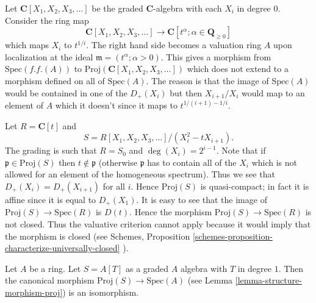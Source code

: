 \begin{example}
\label{example-not-existence-valuative-big-proj}
Let $\mathbf{C}[X_1, X_2, X_3, \ldots]$ be the graded $\mathbf{C}$-algebra
with each $X_i$ in degree $0$. Consider the ring map
$$
\mathbf{C}[X_1, X_2, X_3, \ldots]
\longrightarrow
\mathbf{C}[t^\alpha ; \alpha \in \mathbf{Q}_{\geq 0}]
$$
which maps $X_i$ to $t^{1/i}$. The right hand side becomes a valuation ring
$A$ upon localization at the ideal $\mathfrak m = (t^\alpha ; \alpha > 0)$.
This gives a morphism from $\text{Spec}(f.f.(A))$ to
$\text{Proj}(\mathbf{C}[X_1, X_2, X_3, \ldots])$ which does not
extend to a morphism defined on all of $\text{Spec}(A)$.
The reason is that the image of $\text{Spec}(A)$ would be contained
in one of the $D_{+}(X_i)$ but then $X_{i + 1}/X_i$ would map
to an element of $A$ which it doesn't since it maps to
$t^{1/(i + 1) - 1/i}$.
\end{example}

\begin{example}
\label{example-not-existence-valuative-small-proj}
Let $R = \mathbf{C}[t]$ and
$$
S = R[X_1, X_2, X_3, \ldots]/(X_i^2 - tX_{i + 1}).
$$
The grading is such that $R = S_0$ and $\deg(X_i) = 2^{i - 1}$.
Note that if $\mathfrak p \in \text{Proj}(S)$ then
$t \not \in \mathfrak p$ (otherwise $\mathfrak p$ has to contain
all of the $X_i$ which is not allowed for an element of
the homogeneous spectrum). Thus we see that
$D_{+}(X_i) = D_{+}(X_{i + 1})$ for all $i$. Hence
$\text{Proj}(S)$ is quasi-compact; in fact it is affine
since it is equal to $D_{+}(X_1)$. It is easy to see that
the image of $\text{Proj}(S) \to \text{Spec}(R)$ is
$D(t)$. Hence the morphism $\text{Proj}(S) \to \text{Spec}(R)$
is not closed. Thus the valuative criterion cannot apply because
it would imply that the morphism is closed (see
Schemes, Proposition \ref{schemes-proposition-characterize-universally-closed}
).
\end{example}

\begin{example}
\label{example-trivial-proj}
Let $A$ be a ring.
Let $S = A[T]$ as a graded $A$ algebra with $T$ in degree $1$.
Then the canonical morphism $\text{Proj}(S) \to \text{Spec}(A)$
(see Lemma \ref{lemma-structure-morphism-proj})
is an isomorphism.
\end{example}























